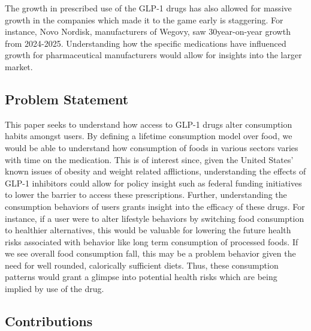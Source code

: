 \documentclass[11pt,a4paper]{article}
\begin{document}
The growth in prescribed use of the GLP-1 drugs has also allowed for massive growth in the companies which made it to the game early is staggering.
For instance, Novo Nordisk, manufacturers of Wegovy, saw 30\percent year-on-year growth from 2024-2025. Understanding how the specific medications
have influenced growth for pharmaceutical manufacturers would allow for insights into the larger market.

\subsection{Problem Statement}
\label{subsec:problem}
This paper seeks to understand how access to GLP-1 drugs alter consumption habits amongst users. By defining a lifetime consumption model over food,
we would be able to understand how consumption of foods in various sectors varies with time on the medication. This is of interest since, given the 
United States' known issues of obesity and weight related afflictions, understanding the effects of GLP-1 inhibitors could allow for policy insight
such as federal funding initiatives to lower the barrier to access these prescriptions. Further, understanding the consumption behaviors of users 
grants insight into the efficacy of these drugs. For instance, if a user were to alter lifestyle behaviors by switching food consumption to healthier
alternatives, this would be valuable for lowering the future health risks associated with behavior like long term consumption of processed foods. If we
see overall food consumption fall, this may be a problem behavior given the need for well rounded, calorically sufficient diets. Thus, these consumption
patterns would grant a glimpse into potential health risks which are being implied by use of the drug.


\subsection{Contributions}
\label{subsec:contributions}

\end{document}
